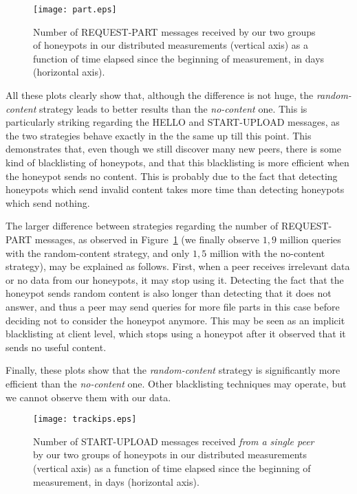\documentclass[final,
notitlepage,
narroweqnarray,
	inline,
	twoside,
]{ieee}
\begin{document}
\begin{figure}[h!]
  \centering
  \texttt{[image: part.eps]}
  \caption{Number of REQUEST-PART messages received by our two groups
    of honeypots in our distributed measurements (vertical axis) as a function of time elapsed since
    the beginning of measurement, in days (horizontal axis).}
  \label{fig-part}
\end{figure}

All these plots clearly show that, although the difference is not
huge, the {\em random-content} strategy leads to better results than
the {\em no-content} one. This is particularly striking regarding the
HELLO and START-UPLOAD messages, as the two strategies behave exactly
in the the same up till this point. This demonstrates that, even though we
still discover many new peers, there is some kind of blacklisting of
honeypots, and that this blacklisting is more efficient when the
honeypot sends no content. This is probably due to the fact that
detecting honeypots which send invalid content takes more time than
detecting honeypots which send nothing.

The larger difference between strategies regarding the number of
REQUEST-PART messages, as observed in Figure~\ref{fig-part} (we
finally observe $1,9$ million queries with the random-content
strategy, and only $1,5$ million with the no-content strategy), may be
explained as follows. First, when a peer receives irrelevant data or
no data from our honeypots, it may stop using it.
Detecting the fact that the honeypot sends random content is also longer
than detecting that it does not answer, and thus a peer may send
queries for more file parts in this case before deciding not to
consider the honeypot anymore. This may be seen as an implicit
blacklisting at client level, which stops using a honeypot after it
observed that it sends no useful content.

Finally, these plots show that the {\em random-content} strategy
is significantly more efficient than the {\em no-content} one. Other
blacklisting techniques may operate, but we cannot observe them with
our data.

\medskip

\begin{figure}[h!]
  \centering
  \texttt{[image: trackips.eps]}
  \caption{Number of START-UPLOAD messages received {\em from a single
      peer} by our two groups of honeypots  in our distributed measurements (vertical axis) as a
    function of time elapsed since the beginning of measurement, in
    days (horizontal axis).}
  \label{fig-start-one}
\end{figure}
\end{document}
